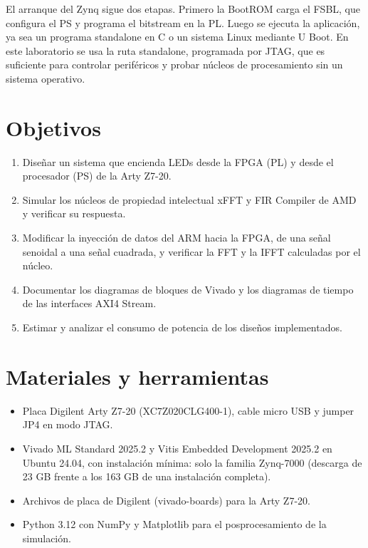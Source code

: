 \documentclass[11pt,a4paper]{article}
\begin{document}
El arranque del Zynq sigue dos etapas. Primero la BootROM carga el FSBL, que configura el PS y programa el bitstream en la PL. Luego se ejecuta la aplicación, ya sea un programa standalone en C o un sistema Linux mediante U Boot. En este laboratorio se usa la ruta standalone, programada por JTAG, que es suficiente para controlar periféricos y probar núcleos de procesamiento sin un sistema operativo.

\section{Objetivos}
\begin{enumerate}
  \item Diseñar un sistema que encienda LEDs desde la FPGA (PL) y desde el procesador (PS) de la Arty Z7-20.
  \item Simular los núcleos de propiedad intelectual xFFT y FIR Compiler de AMD y verificar su respuesta.
  \item Modificar la inyección de datos del ARM hacia la FPGA, de una señal senoidal a una señal cuadrada, y verificar la FFT y la IFFT calculadas por el núcleo.
  \item Documentar los diagramas de bloques de Vivado y los diagramas de tiempo de las interfaces AXI4 Stream.
  \item Estimar y analizar el consumo de potencia de los diseños implementados.
\end{enumerate}

\section{Materiales y herramientas}
\begin{itemize}
  \item Placa Digilent Arty Z7-20 (XC7Z020CLG400-1), cable micro USB y jumper JP4 en modo JTAG.
  \item Vivado ML Standard 2025.2 y Vitis Embedded Development 2025.2 en Ubuntu 24.04, con instalación mínima: solo la familia Zynq-7000 (descarga de 23 GB frente a los 163 GB de una instalación completa).
  \item Archivos de placa de Digilent (vivado-boards) para la Arty Z7-20.
  \item Python 3.12 con NumPy y Matplotlib para el posprocesamiento de la simulación.
\end{itemize}
\end{document}
